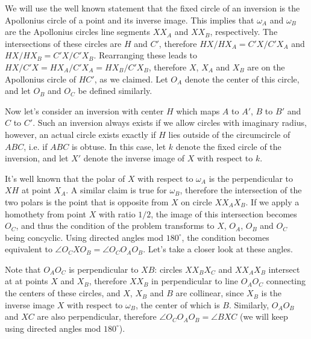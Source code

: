 \documentclass{article}
\begin{document}
We will use the well known statement that the fixed circle of an inversion is the Apollonius circle of a point and its inverse image. This implies that \(\displaystyle \omega_A\) and \(\displaystyle \omega_B\) are the Apollonius circles line segments \(\displaystyle XX_A\) and \(\displaystyle XX_B\), respectively. The intersections of these circles are \(\displaystyle H\) and \(\displaystyle C'\), therefore \(\displaystyle HX/HX_A=C'X/C'X_A\) and \(\displaystyle HX/HX_B=C'X/C'X_B\). Rearranging these leads to \(\displaystyle HX/C'X=HX_A/C'X_A=HX_B/C'X_B\), therefore \(\displaystyle X\), \(\displaystyle X_A\) and \(\displaystyle X_B\) are on the Apollonius circle of \(\displaystyle HC'\), as we claimed. Let \(\displaystyle O_A\) denote the center of this circle, and let \(\displaystyle O_B\) and \(\displaystyle O_C\) be defined similarly.

Now let's consider an inversion with center \(\displaystyle H\) which maps \(\displaystyle A\) to \(\displaystyle A'\), \(\displaystyle B\) to \(\displaystyle B'\) and \(\displaystyle C\) to \(\displaystyle C'\). Such an inversion always exists if we allow circles with imaginary radius, however, an actual circle exists exactly if \(\displaystyle H\) lies outside of the circumcircle of \(\displaystyle ABC\), i.e. if \(\displaystyle ABC\) is obtuse. In this case, let \(\displaystyle k\) denote the fixed circle of the inversion, and let \(\displaystyle X'\) denote the inverse image of \(\displaystyle X\) with respect to \(\displaystyle k\).

It's well known that the polar of \(\displaystyle X\) with respect to \(\displaystyle \omega_A\) is the perpendicular to \(\displaystyle XH\) at point \(\displaystyle X_A\). A similar claim is true for \(\displaystyle \omega_B\), therefore the intersection of the two polars is the point that is opposite from \(\displaystyle X\) on circle \(\displaystyle XX_AX_B\). If we apply a homothety from point \(\displaystyle X\) with ratio \(\displaystyle 1/2\), the image of this intersection becomes \(\displaystyle O_C\), and thus the condition of the problem transforms to \(\displaystyle X\), \(\displaystyle O_A\), \(\displaystyle O_B\) and \(\displaystyle O_C\) being concyclic. Using directed angles mod \(\displaystyle 180^{\circ}\), the condition becomes equivalent to \(\displaystyle \angle O_CXO_B=\angle O_CO_AO_B\). Let's take a closer look at these angles.

Note that \(\displaystyle O_AO_C\) is perpendicular to \(\displaystyle XB\): circles \(\displaystyle XX_BX_C\) and \(\displaystyle XX_AX_B\) intersect at at points \(\displaystyle X\) and \(\displaystyle X_B\), therefore \(\displaystyle XX_B\) in perpendicular to line \(\displaystyle O_AO_C\) connecting the centers of these circles, and \(\displaystyle X\), \(\displaystyle X_B\) and \(\displaystyle B\) are collinear, since \(\displaystyle X_B\) is the inverse image \(\displaystyle X\) with respect to \(\displaystyle \omega_B\), the center of which is \(\displaystyle B\). Similarly, \(\displaystyle O_AO_B\) and \(\displaystyle XC\) are also perpendicular, therefore \(\displaystyle \angle O_CO_AO_B = \angle BXC\) (we will keep using directed angles mod \(\displaystyle 180^{\circ}\)).
\end{document}

